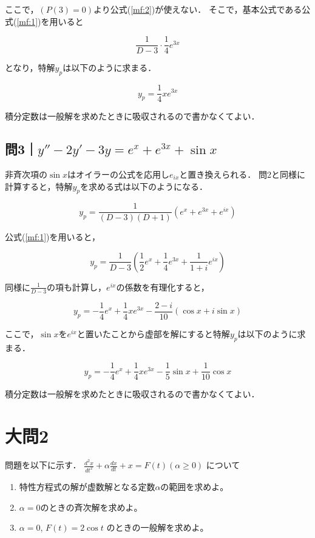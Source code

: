 \documentclass[a4paper,11pt]{bxjsarticle}
\begin{document}
ここで，$(P(3)= 0)$より公式(\ref{mf:2})が使えない．
そこで，基本公式である公式(\ref{mf:1})を用いると

\begin{equation}
  \frac{1}{D-3}\cdot\frac{1}{4}e^{3x}
\end{equation}

となり，特解$y_p$は以下のように求まる．

\begin{equation}
  y_p=\frac{1}{4}xe^{3x}
\end{equation}

積分定数は一般解を求めたときに吸収されるので書かなくてよい．

\subsection{問3｜$y''-2y'-3y=e^x+e^{3x}+\sin x$}
非斉次項の$\sin x$はオイラーの公式を応用し$e_{ix}$と置き換えられる．
問2と同様に計算すると，特解$y_p$を求める式は以下のようになる．

\begin{equation}
  y_p = \frac{1}{(D - 3)(D + 1)}(e^x + e^{3x} + e^{ix})
\end{equation}

公式(\ref{mf:1})を用いると，

\begin{equation}
  y_p = \frac{1}{D - 3}(\frac{1}{2}e^x + \frac{1}{4}e^{3x} + \frac{1}{1+i}e^{ix})
\end{equation}

同様に$\frac{1}{D-3}$の項も計算し，$e^{ix}$の係数を有理化すると，

\begin{equation}
  y_p = -\frac{1}{4}e^x + \frac{1}{4}xe^{3x} - \frac{2 - i}{10}(\cos x + i\sin x)
\end{equation}

ここで，$\sin x$を$e^{ix}$と置いたことから虚部を解にすると特解$y_p$は以下のように求まる．

\begin{equation}
  y_p = -\frac{1}{4}e^x + \frac{1}{4}xe^{3x} - \frac{1}{5}\sin x + \frac{1}{10}\cos x
\end{equation}

積分定数は一般解を求めたときに吸収されるので書かなくてよい．

\section{大問2}
問題を以下に示す．
$\frac{d^2x}{dt^2}+\alpha \frac{dx}{dt}+x=F(t)　(\alpha \geq 0)$ について
\begin{enumerate}
  \item 特性方程式の解が虚数解となる定数$\alpha$の範囲を求めよ。
  \item $\alpha=0$のときの斉次解を求めよ。
  \item $\alpha=0$, $F(t)=2\cos 𝑡$ のときの一般解を求めよ。
\end{enumerate}
\end{document}
